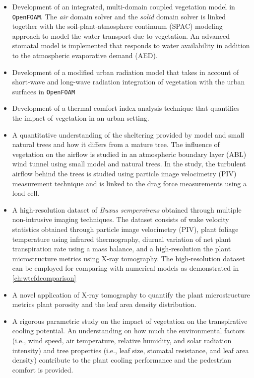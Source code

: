 \begin{itemize}
	\item Development of an integrated, multi-domain coupled vegetation model in \texttt{OpenFOAM}. The \textit{air} domain solver and the \textit{solid} domain solver is linked together with the soil-plant-atmosphere continuum (SPAC) modeling approach to model the water transport due to vegetation. An advanced stomatal model is implemented that responds to water availability in addition to the atmospheric evaporative demand (AED).
	
	\item Development of a modified urban radiation model that takes in account of short-wave and long-wave radiation integration of vegetation with the urban surfaces in \texttt{OpenFOAM}
	
	\item Development of a thermal comfort index analysis technique that quantifies the impact of vegetation in an urban setting.

	\item A quantitative understanding of the sheltering provided by model and small natural trees and how it differs from a mature tree. The influence of vegetation on the airflow is studied in an atmospheric boundary layer (ABL) wind tunnel using small model and natural trees. In the study, the turbulent airflow behind the trees is studied using particle image velocimetry (PIV) measurement technique and is linked to the drag force measurements using a load cell. 
	
	\item A high-resolution dataset of \textit{Buxus sempervirens} obtained through multiple non-intrusive imaging techniques. The dataset consists of wake velocity statistics obtained through particle image velocimetry (PIV), plant foliage temperature using infrared thermography, diurnal variation of net plant transpiration rate using a mass balance, and a high-resolution the plant microstructure metrics using  X-ray tomography. The high-resolution dataset can be employed for comparing with numerical models as demonstrated in \cref{ch:wtcfdcomparison}

	\item A novel application of X-ray tomography to quantify the plant microstructure metrics plant porosity and the leaf area density distribution. 

	\item A rigorous parametric study on the impact of vegetation on the transpirative cooling potential. An understanding on how much the environmental factors (i.e., wind speed, air temperature, relative humidity, and solar radiation intensity) and tree properties (i.e., leaf size, stomatal resistance, and leaf area density) contribute to the plant cooling performance and the pedestrian comfort is provided. 
	

\end{itemize}
